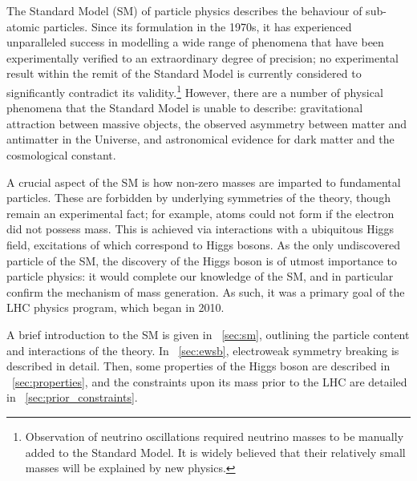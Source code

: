 
The Standard Model (SM) of particle physics describes the behaviour of sub-atomic particles. 
Since its formulation in the 1970s, it has experienced unparalleled success in modelling a 
wide range of phenomena that have been experimentally verified to an extraordinary 
degree of precision; no experimental result within the remit of the Standard Model is 
currently considered to significantly contradict its validity.\footnote{
	Observation of neutrino oscillations required neutrino masses to be manually added to 
	the Standard Model. It is widely believed that their relatively small masses will be 
	explained by new physics.
}
However, there are a number of physical phenomena that the Standard Model is unable to 
describe: gravitational attraction between massive objects, the observed asymmetry between 
matter and antimatter in the Universe, and astronomical evidence for dark matter and the 
cosmological constant.

A crucial aspect of the SM is how non-zero masses are imparted to fundamental particles. 
These are forbidden by underlying symmetries of the theory, though remain an experimental 
fact; for example, atoms could not form if the electron did not possess mass. This is 
achieved via interactions with a ubiquitous Higgs field, excitations of which correspond to 
Higgs bosons. As the only undiscovered particle of the SM, the discovery of the Higgs boson 
is of utmost importance to particle physics: it would complete our knowledge of the SM, and 
in particular confirm the mechanism of mass generation. As such, it was a primary goal of the 
LHC physics program, which began in 2010.

A brief introduction to the SM is given in \Section~\ref{sec:sm}, outlining the 
particle content and interactions of the theory. In \Section~\ref{sec:ewsb}, electroweak 
symmetry breaking is described in detail. Then, some properties of the Higgs boson are 
described in \Section~\ref{sec:properties}, and the constraints upon its mass prior to the 
LHC are detailed in \Section~\ref{sec:prior_constraints}.
